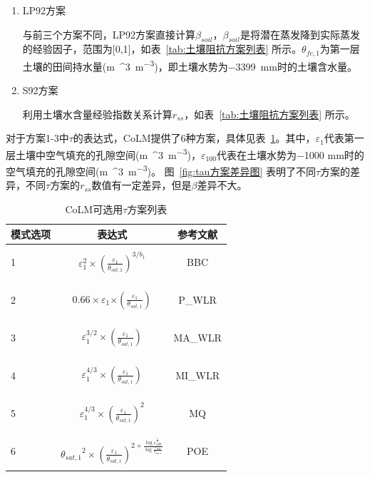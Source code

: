 \begin{enumerate}
\item
  LP92方案

与前三个方案不同，LP92方案直接计算\(\beta_{soil}\)，\(\beta_{soil}\)是将潜在蒸发降到实际蒸发的经验因子，范围为{[}0,1{]}，如表~\ref{tab:土壤阻抗方案列表} 所示。\(\theta_{fc,1}\)为第一层土壤的田间持水量(\unit{m{^3}.m^{-3}})，即土壤水势为\qty{-3399}{mm}时的土壤含水量。

\item
  S92方案

利用土壤水含量经验指数关系计算\(r_{ss}\)，如表~\ref{tab:土壤阻抗方案列表} 所示。
%
\end{enumerate}

对于方案1-3中\(\tau\)的表达式，CoLM提供了6种方案，具体见表~\ref{tab:tau方案列表}。其中，\(\varepsilon_{1}\)代表第一层土壤中空气填充的孔隙空间(\unit{m{^3}.m^{-3}})，\(\varepsilon_{100}\)代表在土壤水势为\num{-1000} mm时的空气填充的孔隙空间(\unit{m{^3}.m^{-3}})。
图~\ref{fig:tau方案差异图} 表明了不同\(\tau\)方案的差异，不同\(\tau\)方案的\(r_{ss}\)数值有一定差异，但是$\beta$差异不大。

{
\begin{table}[htbp]
\centering
\caption{CoLM可选用$\tau$方案列表}
\label{tab:tau方案列表}
\begin{tabular}{lcc}
\toprule
模式选项 & 表达式 & 参考文献 \\ 
\midrule
1 &
\(\varepsilon_{1}^{2} \times {(\frac{\varepsilon_{1}}{\theta_{sat,1}})}^{3/b_{1}}\)
& \citet{BBC1999}

BBC \\
2 &
\(0.66 \times \varepsilon_{1}{\times (\frac{\varepsilon_{1}}{\theta_{sat,1}})}\)
& \citet{moldrup2000}

P\_WLR \\
3 &
\(\varepsilon_{1}^{3/2} \times (\frac{\varepsilon_{1}}{\theta_{sat,1}})\)
& \citet{moldrup2000}

MA\_WLR \\
4 &
\(\varepsilon_{1}^{4/3} \times (\frac{\varepsilon_{1}}{\theta_{sat,1}})\)
& \citet{moldrup2000}

MI\_WLR \\
5 &
\(\varepsilon_{1}^{4/3} \times {(\frac{\varepsilon_{1}}{\theta_{sat,1}})}^{2}\)
& \citet{millington_permeability_1961}

MQ \\
6 &
\({\theta_{sat,1}}^{2} \times {(\frac{\varepsilon_{1}}{\theta_{sat,1}})}^{2 + \frac{\log\varepsilon_{100}^{\frac{1}{4}}}{\log\frac{\varepsilon_{100}}{\theta_{sat,1}}}}\)
& \citet{POE2005}

POE \\ \bottomrule    
\end{tabular}
\end{table}
}

